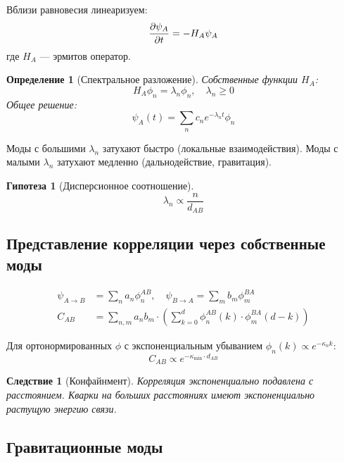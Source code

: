 \documentclass[11pt,a4paper]{article}
\newtheorem{definition}{Определение}[section]
\newtheorem{corollary}{Следствие}[section]
\newtheorem{hypothesis}{Гипотеза}[section]
\theoremstyle{definition}
\begin{document}
Вблизи равновесия линеаризуем:
\begin{equation}
    \pdv{\psi_A}{t} = -H_A \psi_A
\end{equation}
где $H_A$ --- эрмитов оператор.

\begin{definition}[Спектральное разложение]
Собственные функции $H_A$:
\begin{equation}
    H_A \phi_n = \lambda_n \phi_n, \quad \lambda_n \geq 0
\end{equation}
Общее решение:
\begin{equation}
    \psi_A(t) = \sum_n c_n e^{-\lambda_n t} \phi_n
\end{equation}
\end{definition}

Моды с большими $\lambda_n$ затухают быстро (локальные взаимодействия).
Моды с малыми $\lambda_n$ затухают медленно (дальнодействие, гравитация).

\begin{hypothesis}[Дисперсионное соотношение]
\begin{equation}
    \lambda_n \propto \frac{n}{d_{AB}}
\end{equation}
\end{hypothesis}

\subsection{Представление корреляции через собственные моды}

\begin{align}
    \psi_{A \to B} &= \sum_n a_n \phi_n^{AB}, \quad \psi_{B \to A} = \sum_m b_m \phi_m^{BA} \\
    C_{AB} &= \sum_{n,m} a_n b_m \cdot \left( \sum_{k=0}^{d} \phi_n^{AB}(k) \cdot \phi_m^{BA}(d-k) \right)
\end{align}

Для ортонормированных $\phi$ с экспоненциальным убыванием $\phi_n(k) \propto e^{-\kappa_n k}$:
\begin{equation}
    C_{AB} \propto e^{-\kappa_{\min} \cdot d_{AB}}
\end{equation}

\begin{corollary}[Конфайнмент]
Корреляция экспоненциально подавлена с расстоянием. Кварки на больших расстояниях имеют экспоненциально растущую энергию связи.
\end{corollary}

\subsection{Гравитационные моды}
\end{document}
